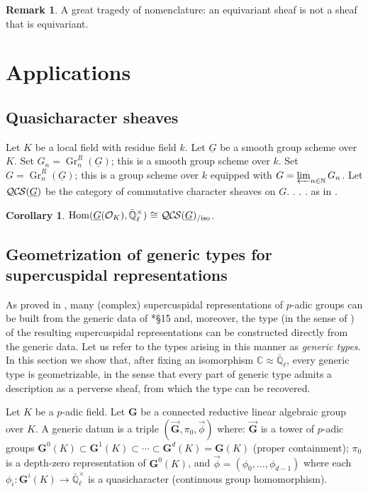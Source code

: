 \documentclass[10pt]{amsart}
\theoremstyle{plain}
\newtheorem{corollary}[theorem]{Corollary}
\theoremstyle{definition}
\newtheorem{remark}[theorem]{Remark}
\newcommand{\NN}{{\mathbb{N}}}
\newcommand{\CC}{{\mathbb{C}}}
\newcommand{\EE}{\mathbb{\bar Q}_\ell}
\newcommand{\OK}{\mathcal{O}_K}
\newcommand{\Fq}{k}
\newcommand{\EEx}{\EE^\times}
\newcommand{\G}{\textbf{G}}
\DeclareMathOperator{\Hom}{Hom}
\DeclareMathOperator{\Gr}{Gr}
\newcommand{\iso}{{\ \cong\ }}
\newcommand{\QCS}{{\mathcal{QC\hskip-0.8pt S}}}
\newcommand{\QCSiso}[1]{\QCS(#1)_{/\text{iso}}}
\begin{document}
\begin{remark}
A great tragedy of nomenclature: an equivariant sheaf is not a sheaf that is equivariant.  
\end{remark}
 
\section{Applications}

\subsection{Quasicharacter sheaves}

Let $K$ be a local field with residue field $\Fq$.
Let $\underline{G}$ be a smooth group scheme over $K$.
Set $G_n = \Gr^R_n(\underline{G})$; this is a smooth group scheme over $\Fq$.
Set $G = \Gr^R_n(\underline{G})$; this is a group scheme over $\Fq$ equipped with $G = \varprojlim_{n\in \NN} G_n$.
Let $\QCS(\underline{G})$ be the category of commutative character sheaves on $G$. . . .  as in \cite{cunningham-roe:13a}.

\begin{corollary}\label{cor:QCS}
$\Hom(\underline{G}(\OK),\EEx) \iso \QCSiso{\underline{G}}$.
\end{corollary}

 
\subsection{Geometrization of generic types for supercuspidal representations}

As proved in \cite{kim:07a}, many (complex) supercuspidal representations of $p$-adic groups can be built from the generic data of \cite{yu:01a}*{\S 15} and, moreover, the type (in the sense of \cite{bushnell-kutzko:98a}) of the resulting supercuspidal representations can be constructed directly from the generic data. 
Let us refer to the types arising in this manner as {\it generic types}.
In this section we show that, after fixing an isomorphism $\CC \approx \EE$, every generic type is geometrizable, in the sense that every part of generic type admits a description as a perverse sheaf, from which the type can be recovered.

Let $K$ be a $p$-adic field. Let $\G$ be a connected reductive linear algebraic group over $K$. 
A generic datum is a triple $(\vec{\G}, \pi_0, \vec{\phi})$ where: $\vec{\G}$ is a tower of $p$-adic groups $\G^0(K) \subset \G^1(K) \subset \cdots  \subset \G^d(K) = \G(K)$ (proper containment); $\pi_0$ is a depth-zero representation of $\G^0(K)$, and $\vec{\phi} = (\phi_0, \ldots , \phi_{d-1})$ where each $\phi_i : \G^i(K) \to \EEx$ is a quasicharacter (continuous group homomorphism).  
\end{document}
